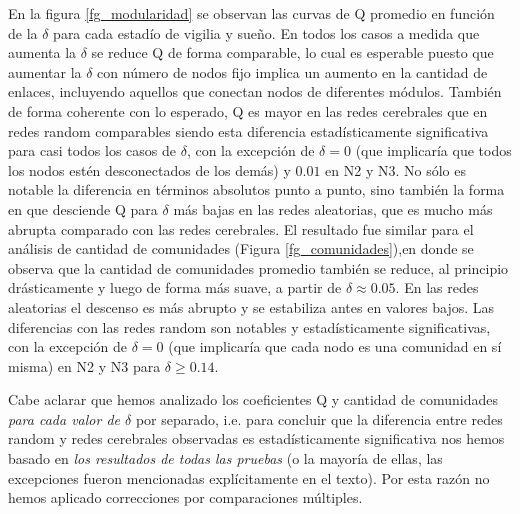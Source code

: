 \documentclass{article}
\begin{document}
En la figura \ref{fg_modularidad} se observan las curvas de Q promedio en función de la $\delta$ para cada estadío de vigilia y sueño.
En todos los casos a medida que aumenta la $\delta$ se reduce Q de forma comparable, lo cual es esperable puesto que aumentar la $\delta$ con número de nodos fijo implica un aumento en la cantidad de enlaces, incluyendo aquellos que conectan nodos de diferentes módulos.
También de forma coherente con lo esperado, Q es mayor en las redes cerebrales que en redes random comparables siendo esta diferencia estadísticamente significativa para casi todos los casos de $\delta$, con la excepción de $\delta = 0$ (que implicaría que todos los nodos estén desconectados de los demás) y $0.01$ en N2 y N3.
No sólo es notable la diferencia en términos absolutos punto a punto, sino también la forma en que desciende Q para $\delta$ más bajas en las redes aleatorias, que es mucho más abrupta comparado con las redes cerebrales.
El resultado fue similar para el análisis de cantidad de comunidades (Figura \ref{fg_comunidades}),en donde se observa que la cantidad de comunidades promedio también se reduce, al principio drásticamente y luego de forma más suave, a partir de $\delta \approx 0.05$.
En las redes aleatorias el descenso es más abrupto y se estabiliza antes en valores bajos.
Las diferencias con las redes random son notables y estadísticamente significativas, con la excepción de $\delta = 0$ (que implicaría que cada nodo es una comunidad en sí misma) en N2 y N3 para $\delta \geq 0.14$.

Cabe aclarar que hemos analizado los coeficientes Q y cantidad de comunidades \textit{para cada valor de $\delta$} por separado, i.e. para concluir que la diferencia entre redes random y redes cerebrales observadas es estadísticamente significativa nos hemos basado en \textit{los resultados de todas las pruebas} (o la mayoría de ellas, las excepciones fueron mencionadas explícitamente en el texto).
Por esta razón no hemos aplicado correcciones por comparaciones múltiples.
\end{document}
